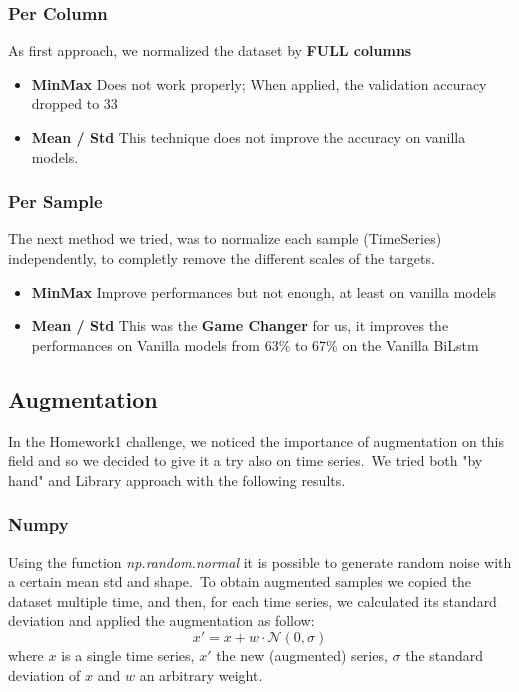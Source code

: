 \documentclass[11pt]{article}
\begin{document}
\subsubsection{Per Column}
As first approach, we normalized the dataset by \textbf{FULL columns}
\begin{itemize}
  \item \textbf{MinMax} Does not work properly; When applied, the validation accuracy dropped to 33%
  \item \textbf{Mean / Std} This technique does not improve the accuracy on vanilla models.
\end{itemize}
\subsubsection{Per Sample}
The next method we tried, was to normalize each sample (TimeSeries) independently, to completly remove the different scales of the targets.
\begin{itemize}
  \item \textbf{MinMax} Improve performances but not enough, at least on vanilla models
  \item \textbf{Mean / Std} This was the \textbf{Game Changer} for us, it improves the performances on Vanilla models from 63\% to 67\% on the Vanilla BiLstm
\end{itemize}
\subsection{Augmentation}
In the Homework1 challenge, we noticed the importance of augmentation on this field and so we decided to give it a try also on time series.\
We tried both "by hand" and Library approach with the following results.
\subsubsection{Numpy}
Using the function \textit{np.random.normal} it is possible to generate random noise with a certain mean std and shape.\
To obtain augmented samples we copied the dataset multiple time, and then, for each time series, we calculated its standard deviation and applied the augmentation as follow:
\begin{equation*}
    x' = x + w\cdot\mathcal{N}(0, \sigma)
\end{equation*}
where $x$ is a single time series, $x'$ the new (augmented) series, $\sigma$ the standard deviation of $x$ and $w$ an arbitrary weight.
\end{document}
